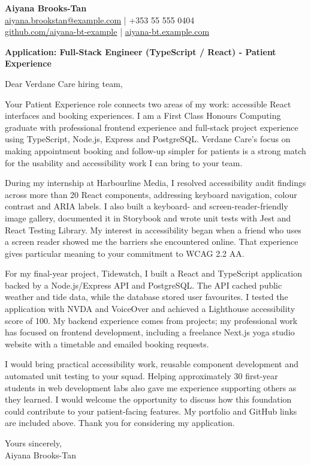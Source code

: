\documentclass[11pt,a4paper]{article}
\begin{document}
{\Large\bfseries\color{primarycolor} Aiyana Brooks-Tan}\\
\href{mailto:aiyana.brookstan@example.com}{aiyana.brookstan@example.com} | +353 55 555 0404\\
\href{https://github.com/aiyana-bt-example}{github.com/aiyana-bt-example} | \href{https://aiyana-bt.example.com}{aiyana-bt.example.com}

\textbf{Application: Full-Stack Engineer (TypeScript / React) - Patient Experience}

Dear Verdane Care hiring team,

Your Patient Experience role connects two areas of my work: accessible React interfaces and booking experiences. I am a First Class Honours Computing graduate with professional frontend experience and full-stack project experience using TypeScript, Node.js, Express and PostgreSQL. Verdane Care's focus on making appointment booking and follow-up simpler for patients is a strong match for the usability and accessibility work I can bring to your team.

During my internship at Harbourline Media, I resolved accessibility audit findings across more than 20 React components, addressing keyboard navigation, colour contrast and ARIA labels. I also built a keyboard- and screen-reader-friendly image gallery, documented it in Storybook and wrote unit tests with Jest and React Testing Library. My interest in accessibility began when a friend who uses a screen reader showed me the barriers she encountered online. That experience gives particular meaning to your commitment to WCAG 2.2 AA.

For my final-year project, Tidewatch, I built a React and TypeScript application backed by a Node.js/Express API and PostgreSQL. The API cached public weather and tide data, while the database stored user favourites. I tested the application with NVDA and VoiceOver and achieved a Lighthouse accessibility score of 100. My backend experience comes from projects; my professional work has focused on frontend development, including a freelance Next.js yoga studio website with a timetable and emailed booking requests.

I would bring practical accessibility work, reusable component development and automated unit testing to your squad. Helping approximately 30 first-year students in web development labs also gave me experience supporting others as they learned. I would welcome the opportunity to discuss how this foundation could contribute to your patient-facing features. My portfolio and GitHub links are included above. Thank you for considering my application.

Yours sincerely,\\
Aiyana Brooks-Tan
\end{document}
